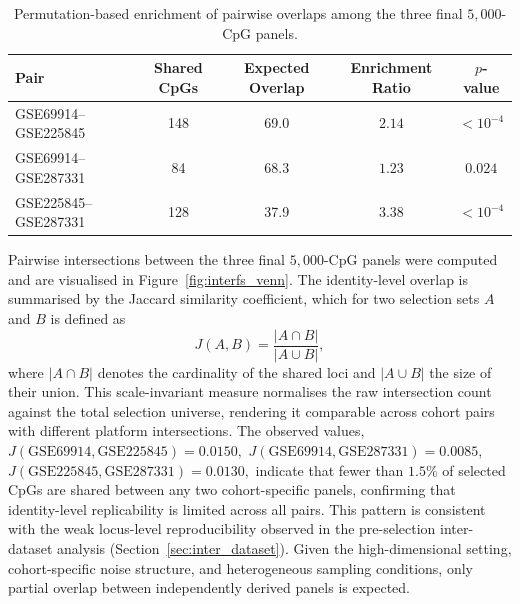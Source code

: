 \begin{table}[t]
\centering
\scriptsize
\caption{Permutation-based enrichment of pairwise overlaps among the three final $5{,}000$-CpG panels.}
\label{tab:interfs_overlap}
\begin{tabular}{l c c c c}
\toprule
Pair & Shared CpGs & Expected Overlap & Enrichment Ratio & $p$-value \\
\midrule
GSE69914--GSE225845 & 148 & 69.0 & $2.14$ & $< 10^{-4}$ \\
GSE69914--GSE287331 &  84 & 68.3 & $1.23$ & $0.024$     \\
GSE225845--GSE287331 & 128 & 37.9 & $3.38$ & $< 10^{-4}$ \\
\bottomrule
\end{tabular}
\end{table}
Pairwise intersections between the three final $5{,}000$-CpG panels were
computed and are visualised in Figure~\ref{fig:interfs_venn}.
The identity-level overlap is summarised by the Jaccard similarity
coefficient, which for two selection sets $A$ and $B$ is defined as
\begin{equation}
    J(A,B) = \frac{|A \cap B|}{|A \cup B|},
    \label{eq:jaccard}
\end{equation}
where $|A \cap B|$ denotes the cardinality of the shared loci and
$|A \cup B|$ the size of their union.
This scale-invariant measure normalises the raw intersection count
against the total selection universe, rendering it comparable across
cohort pairs with different platform intersections.
The observed values,
\(
J(\text{GSE69914},\text{GSE225845}) = 0.0150,\)
\(J(\text{GSE69914},\text{GSE287331}) = 0.0085,\)
\(J(\text{GSE225845},\text{GSE287331}) = 0.0130,
\)
indicate that fewer than $1.5\%$ of selected CpGs are shared between
any two cohort-specific panels, confirming that identity-level
replicability is limited across all pairs.
This pattern is consistent with the weak locus-level reproducibility
observed in the pre-selection inter-dataset analysis
(Section~\ref{sec:inter_dataset}).
Given the high-dimensional setting, cohort-specific noise structure,
and heterogeneous sampling conditions, only partial overlap
between independently derived panels is expected.

